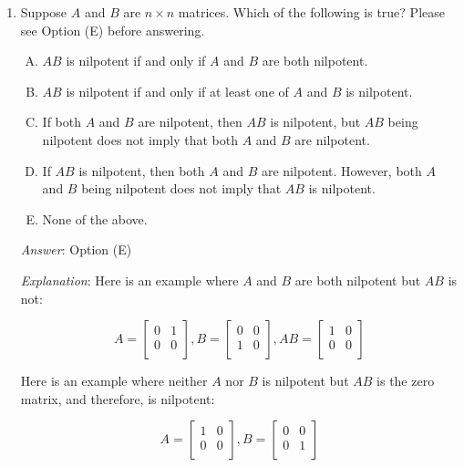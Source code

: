 \documentclass[10pt]{amsart}
\begin{document}
\begin{enumerate}
  {\em Performance review}: 21 out of 26 got this. 3 chose (B), 1 each
  chose (A) and (D).

  {\em Historical note (last time)}: $9$ out of $26$
  got this. $9$ chose (C), $6$ chose (B), $2$ chose (D).
\item Suppose $A$ and $B$ are $n \times n$ matrices. Which of the
  following is true? Please see Option (E) before answering.

  \begin{enumerate}[(A)]
  \item $AB$ is nilpotent if and only if $A$ and $B$ are both nilpotent.
  \item $AB$ is nilpotent if and only if at least one of $A$ and $B$ is nilpotent.
  \item If both $A$ and $B$ are nilpotent, then $AB$ is nilpotent, but
    $AB$ being nilpotent does not imply that both $A$ and $B$ are
    nilpotent.
  \item If $AB$ is nilpotent, then both $A$ and $B$ are
    nilpotent. However, both $A$ and $B$ being nilpotent does not
    imply that $AB$ is nilpotent.
  \item None of the above.
  \end{enumerate}

  {\em Answer}: Option (E)

  {\em Explanation}: Here is an example where $A$ and $B$ are both
  nilpotent but $AB$ is not:

  $$A = \left[ \begin{matrix} 0 & 1 \\ 0 & 0 \\\end{matrix}\right], B = \left[ \begin{matrix} 0 & 0 \\ 1 & 0 \\\end{matrix}\right], AB = \left[ \begin{matrix} 1 & 0 \\ 0 & 0 \\\end{matrix}\right]$$

  Here is an example where neither $A$ nor $B$ is nilpotent but $AB$
  is the zero matrix, and therefore, is nilpotent:

  $$A = \left[ \begin{matrix} 1 & 0 \\ 0 & 0 \\\end{matrix}\right], B = \left[ \begin{matrix} 0 & 0 \\ 0 & 1 \\\end{matrix}\right]$$


\end{enumerate}
\end{document}
